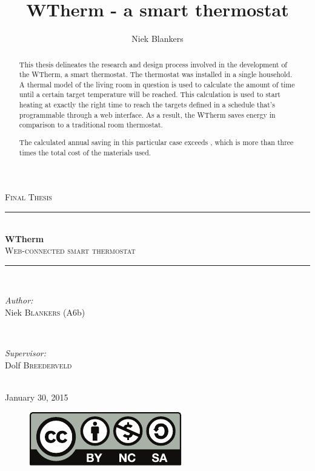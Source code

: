 \documentclass[12pt,a4paper,final]{report}
\author{Niek Blankers}
\title{WTherm - a smart thermostat}
\begin{document}
\begin{titlepage}
\newcommand{\HRule}{\rule{\linewidth}{0.5mm}}

\center

\textsc{\LARGE Final Thesis}\\[1.5cm]

\HRule \\[0.4cm]
{ \huge \bfseries WTherm}\\[0.4cm]
\textsc{\large Web-connected smart thermostat}\\[0.2cm]
\HRule \\[3.5cm]

\begin{minipage}{0.4\textwidth}
\begin{flushleft} \large
\emph{Author:}\\
Niek \textsc{Blankers} (A6b)
\end{flushleft}
\end{minipage}
~
\begin{minipage}{0.4\textwidth}
\begin{flushright} \large
\emph{Supervisor:} \\
Dolf \textsc{Breederveld}
\end{flushright}
\end{minipage}\\[8cm]

{\large January 30, 2015}\\[0.3cm] 
\begin{figure}[!b]
	\centering
	\hyperref[chap:License]{\includegraphics{by-nc-sa}}
\end{figure}

\vfill

\end{titlepage}

\begin{abstract}
This thesis delineates the research and design process involved in the development of the WTherm, a smart thermostat. The thermostat was installed in a single household. A thermal model of the living room in question is used to calculate the amount of time until a certain target temperature will be reached. This calculation is used to start heating at exactly the right time to reach the targets defined in a schedule that's programmable through a web interface. As a result, the WTherm saves energy in comparison to a traditional room thermostat. 

The calculated annual saving in this particular case exceeds , which is more than three times the total cost of the materials used.
\end{abstract}
\end{document}
